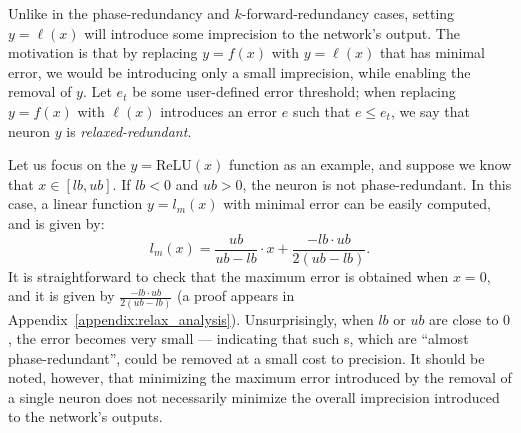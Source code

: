 \documentclass[10pt, conference, twocolumn, compsocconf]{IEEEtran}
\theoremstyle{remark}
\newcommand{\relu}{\text{ReLU}\xspace}
\newcommand{\kfracy}{$k$-forward-redundancy}
\newcommand{\errorMinimizerFunction}{l_m}
\newcommand{\todo}[1]{{\color{red}{\textbf{[TODO]} #1}}}
\begin{document}
Unlike in the phase-redundancy and \kfracy{} cases, setting
$y=\ell(x)$ will introduce some imprecision to the network's output.
The motivation is that by replacing $y=f(x)$ with $y=\ell(x)$ that has
minimal error, we would be introducing only a small imprecision, while enabling
the removal of $y$. Let $e_t$ be some user-defined error threshold;
when replacing $y=f(x)$ with $\ell(x)$ introduces an error $e$ such
that $e\leq e_t$, we say that neuron $y$ is \emph{relaxed-redundant}.


Let us focus on the $y=\relu{}(x)$ function as an example, and suppose
we know that $x\in [lb,ub]$. If $lb<0$ and $ub>0$, the neuron is not phase-redundant.
In this case, a linear function $y=\errorMinimizerFunction{}(x)$ with
minimal error can be easily computed, and is given by:
\[
  \errorMinimizerFunction{}(x) = \frac{ub}{ub - lb} \cdot x
  + \frac{-lb\cdot ub}{2(ub - lb)}.
\]
It is straightforward to check that the maximum error is obtained when
$x = 0$, and it is given by $\frac{-lb \cdot ub}{2(ub - lb)}$ (a proof
appears in Appendix~\ref{appendix:relax_analysis}).  Unsurprisingly,
when $lb$ or $ub$ are close to $0$, the error becomes very small ---
indicating that such \relu{}s, which are ``almost phase-redundant'',
could be removed at a small cost to precision.  It should be noted,
however, that minimizing the maximum error introduced by the removal
of a single neuron does not necessarily minimize the overall
imprecision introduced to the network's outputs.


\end{document}
